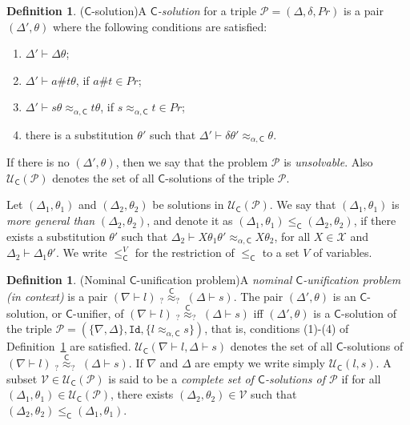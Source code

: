 \documentclass[11pt,a4paper]{amsart}
\newcommand{\caleq}{\approx_{\alpha,\theory{C}}}
\newcommand{\theory}[1]{\ensuremath{\mathsf{#1}}}
\theoremstyle{plain}
\theoremstyle{definition}
\newtheorem{definition}[theorem]{Definition}
\theoremstyle{remark}
\begin{document}
\begin{definition}{($\theory{C}$-solution)}\label{def:csolution}
A \emph{$\theory{C}$-solution} for a triple $\mathcal{P} = (\Delta, \delta, Pr) $ is a pair $(\Delta',\theta)$ where the following conditions are satisfied:
\begin{enumerate}
    \item $\Delta' \vdash \Delta\theta$;
    \item $\Delta' \vdash a\#t\theta$, if $a\#t \in Pr$;
    \item $\Delta' \vdash s\theta \caleq t\theta$, if $s \caleq t \in Pr$;
    \item there is a substitution $\theta'$ such that $\Delta' \vdash \delta\theta' \caleq \theta$.
\end{enumerate}
If there is no $(\Delta', \theta)$, then we say that the problem $\mathcal{P}$ is \emph{unsolvable}. Also $\mathcal{U}_{\theory{C}}(\mathcal{P})$ denotes the set of all $\theory{C}$-solutions of the triple $\mathcal{P}$.
\end{definition}
Let 
 $(\Delta_1, \theta_1)$ and $(\Delta_2, \theta_2)$ be solutions in $\mathcal{U}_{\theory{C}}(\mathcal{P})$. We say that $(\Delta_1, \theta_1)$ is \emph{more general than} $(\Delta_2, \theta_2)$, and denote it as $(\Delta_1,\theta_1) \leq_{\theory{C}} (\Delta_2, \theta_2)$, if there exists a substitution $\theta'$ such that $\Delta_2 \vdash X\theta_1\theta' \caleq X\theta_2$, for all $X\in \mathcal{X}$ and $\Delta_2 \vdash \Delta_1\theta'$. 
We write $\leq^V_\theory{C}$ for the restriction of $\leq_{\theory{C}}$ to a set $V$ of variables.
\begin{definition}{(Nominal $\theory{C}$-unification problem)}\label{def:nominalCunif}
A \emph{nominal $\theory{C}$-unification problem (in context)} is a pair 
 $(\nabla\vdash l)\;_?{\overset{\theory{C}}{\approx}}_?  \; (\Delta\vdash s)$.
The pair $(\Delta',\theta)$ is an $\theory{C}$-solution, or  $\theory{C}$-unifier, of $(\nabla\vdash l) \;_?{\overset{\theory{C}}{\approx}}_?  \; (\Delta\vdash s)$ iff
$(\Delta',\theta)$ is a $\theory{C}$-solution of the triple
$ \mathcal{P}= (\{\nabla,\Delta \}, \texttt{Id}, \{l\caleq s\})$, that is, 
conditions (1)-(4) of Definition~\ref{def:csolution} are satisfied.
$\mathcal{U}_{\theory{C}}(\nabla\vdash l,\Delta\vdash s)$ denotes the set of all $\theory{C}$-solutions of $(\nabla\vdash l) \;_?{\overset{\theory{C}}{\approx}}_?  \; (\Delta\vdash s)$.
If $\nabla$ and $\Delta$ are empty we write  simply $\mathcal{U}_{\theory{C}}(l,s)$. 
A subset $\mathcal{V}\in \mathcal{U}_{\theory{C}}(\mathcal{P})$ is said to be a \emph{complete set of $\theory{C}$-solutions of $\mathcal{P}$} if for all $(\Delta_1,\theta_1) \in \mathcal{U}_{\theory{C}}(\mathcal{P})$, there exists $(\Delta_2, \theta_2) \in \mathcal{V}$ such that $(\Delta_2,\theta_2) \leq_{\theory{C}} (\Delta_1, \theta_1)$.
\end{definition}
\end{document}
